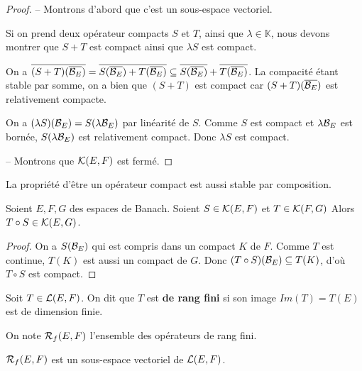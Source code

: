 \begin{proof}
	-- Montrons d'abord que c'est un sous-espace vectoriel.

	Si on prend deux opérateur compacts $S$ et $T$, ainsi que $\lambda \in
	\mathbb{K}$, nous devons montrer que $S + T$ est compact ainsi que $\lambda S$
	est compact.

	On a $\overline{(S + T)(\overline{\mathcal{B}_{E}})} =  \overline{S(\overline{\mathcal{B}_{E}}) +
	T(\overline{\mathcal{B}_{E}})} \subseteq \overline{S(\overline{\mathcal{B}_{E}})} +
	\overline{T(\overline{\mathcal{B}_{E}})}$. La compacité étant stable par somme, on a bien
	que $(S + T)$ est compact car $(S + T)(\overline{\mathcal{B}_{E}})$ est relativement
	compacte.

	On a $(\lambda S)(\mathcal{B}_{E}) = S(\lambda \mathcal{B}_{E})$ par
	linéarité de $S$. Comme $S$ est compact et $\lambda \mathcal{B}_{E}$ est
	bornée, $S(\lambda \mathcal{B}_{E})$ est relativement compact. Donc
	$\lambda S$ est compact.

	-- Montrons que $\mathcal{K}(E, F)$ est fermé.
\end{proof}

La propriété d'être un opérateur compact est aussi stable par composition.

\begin{proposition}
	Soient $E, F, G$ des espaces de Banach.
	Soient $S \in \mathcal{K}(E, F)$ et $T \in \mathcal{K}(F, G)$
	Alors $T \circ S \in \mathcal{K}(E, G)$.
\end{proposition}

\begin{proof}
	On a $S(\mathcal{B}_{E})$ qui est compris dans un compact $K$ de $F$. Comme $T$ est
	continue, $T(K)$ est aussi un compact de $G$. Donc $(T \circ
	S)(\mathcal{B}_{E}) \subseteq T(K)$, d'où $T \circ S$ est compact.
\end{proof}

\begin{definition}
	Soit $T \in \mathcal{L}(E, F)$. On dit que $T$ est \textbf{de rang fini}
	si son image $Im(T) = T(E)$ est de dimension finie.

	On note $\mathcal{R}_{f}(E, F)$ l'ensemble des opérateurs de rang fini.
\end{definition}

\begin{proposition}
	$\mathcal{R}_{f}(E, F)$ est un sous-espace vectoriel de
	$\mathcal{L}(E, F)$.
\end{proposition}

